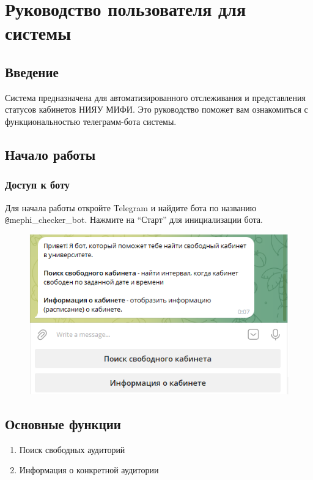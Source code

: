 \chapter{Руководство пользователя для системы}

\section*{Введение}

Система предназначена для автоматизированного отслеживания и представления
статусов кабинетов НИЯУ МИФИ. Это руководство поможет вам ознакомиться с
функциональностью телеграмм-бота системы.

\section*{Начало работы}

\subsection*{Доступ к боту}
Для начала работы откройте Telegram и найдите бота по названию
\texttt{@}mephi\_checker\_bot. Нажмите на ``Старт'' для инициализации бота.

\begin{figure}[h]
    \centering
    \includegraphics[scale=0.8]{img/1}
    \caption{}
    \label{fig:cp}
\end{figure}

\section*{Основные функции}
\begin{enumerate}
    \item Поиск свободных аудиторий
    \item Информация о конкретной аудитории
\end{enumerate}

